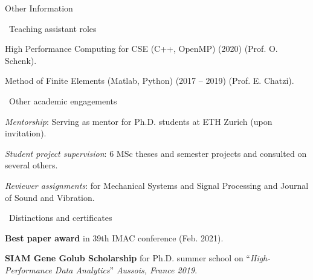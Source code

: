 \documentclass{resume_v2} %
\begin{document}
\begin{rSection}{Other Information}
  \begin{rSubsection}{\,\,\,Teaching assistant roles}{}{}{} 
    \item High Performance Computing for CSE (C++, OpenMP) (2020) (Prof. O. Schenk).
    \item Method of Finite Elements (Matlab, Python) (2017 -- 2019) (Prof. E. Chatzi).
  \end{rSubsection}
   \begin{rSubsection}{\,\,\,Other academic engagements}{}{}{}
   \item \textit{Mentorship}: Serving as mentor for Ph.D. students at ETH Zurich (upon invitation).
   \item \textit{Student project supervision}: 6 MSc theses and semester projects and consulted on several others.
  \item \textit{Reviewer assignments}: for Mechanical Systems and Signal Processing and Journal of Sound and Vibration.
  \end{rSubsection}


  \begin{rSubsection}{\,\,\,Distinctions and certificates}{}{}{}
\item {\textbf{Best paper award}} in 39th IMAC conference (Feb. 2021). %
  \item \textbf{SIAM Gene Golub Scholarship} for Ph.D. summer school on ``\textit{{High-Performance Data Analytics}}'' \textit{Aussois, France 2019}.
  \end{rSubsection}

\end{rSection}
\end{document}
